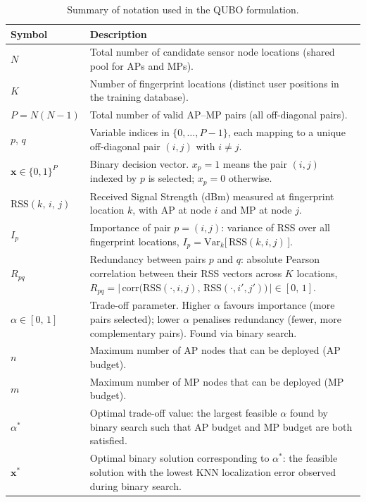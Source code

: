 \documentclass[12pt]{article}
\begin{document}
\begin{table}[h!]
\centering
\renewcommand{\arraystretch}{1.5}
\begin{tabular}{>{\bfseries}l p{10cm}}
\toprule
Symbol & Description \\
\midrule
$N$
    & Total number of candidate sensor node locations
      (shared pool for APs and MPs). \\
$K$
    & Number of fingerprint locations (distinct user positions
      in the training database). \\
$P = N(N-1)$
    & Total number of valid AP--MP pairs (all off-diagonal pairs). \\
$p,\, q$
    & Variable indices in $\{0, \ldots, P-1\}$, each mapping to a
      unique off-diagonal pair $(i,j)$ with $i \neq j$. \\
$\mathbf{x} \in \{0,1\}^{P}$
    & Binary decision vector. $x_p = 1$ means the pair $(i,j)$
      indexed by $p$ is selected; $x_p = 0$ otherwise. \\
$\text{RSS}(k,\, i,\, j)$
    & Received Signal Strength (dBm) measured at fingerprint
      location $k$, with AP at node $i$ and MP at node $j$. \\
$I_p$
    & Importance of pair $p = (i,j)$: variance of RSS over all
      fingerprint locations,
      $I_p = \mathrm{Var}_{k}\bigl[\,\text{RSS}(k,i,j)\,\bigr]$. \\
$R_{pq}$
    & Redundancy between pairs $p$ and $q$: absolute Pearson
      correlation between their RSS vectors across $K$ locations,
      $R_{pq} = \bigl|\,\mathrm{corr}\bigl(\text{RSS}(\cdot,i,j),\,
      \text{RSS}(\cdot,i',j')\bigr)\,\bigr| \in [0,\,1]$. \\
$\alpha \in [0,\,1]$
    & Trade-off parameter. Higher $\alpha$ favours importance
      (more pairs selected); lower $\alpha$ penalises redundancy
      (fewer, more complementary pairs). Found via binary search. \\
$n$
    & Maximum number of AP nodes that can be deployed (AP budget). \\
$m$
    & Maximum number of MP nodes that can be deployed (MP budget). \\
$\alpha^*$
    & Optimal trade-off value: the largest feasible $\alpha$ found
      by binary search such that AP budget and MP budget are both
      satisfied. \\
$\mathbf{x}^*$
    & Optimal binary solution corresponding to $\alpha^*$: the
      feasible solution with the lowest KNN localization error
      observed during binary search. \\
\bottomrule
\end{tabular}
\caption{Summary of notation used in the QUBO formulation.}
\end{table}
\end{document}
